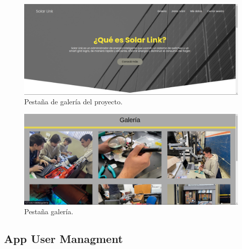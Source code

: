 \begin{figure}[H]
    \centering
    \includegraphics[width=1\linewidth]{web/Captura desde 2023-10-15 22-47-12.png}
    \caption{Pestaña de galería del proyecto.}
    \label{fig:galeria-web}
\end{figure}

\begin{figure}[H]
    \centering
    \includegraphics[width=0.8\linewidth]{web/Captura desde 2023-10-15 22-55-41.png}
    \caption{Pestaña galería.}
    \label{fig:user-log}
\end{figure}


\subsection{App User Managment}

